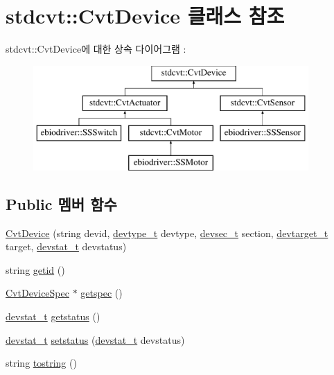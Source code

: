 \hypertarget{classstdcvt_1_1CvtDevice}{}\section{stdcvt\+:\+:Cvt\+Device 클래스 참조}
\label{classstdcvt_1_1CvtDevice}
stdcvt\+:\+:Cvt\+Device에 대한 상속 다이어그램 \+: \begin{figure}[H]
\begin{center}
\leavevmode
\includegraphics[height=4.000000cm]{classstdcvt_1_1CvtDevice}
\end{center}
\end{figure}
\subsection*{Public 멤버 함수}
\begin{DoxyCompactItemize}
\item 
\hyperlink{classstdcvt_1_1CvtDevice_a551fc68d0c8cbcbc8f6c82b375ea3cb0}{Cvt\+Device} (string devid, \hyperlink{cvtcode_8h_ae8e34073e35cef0bb47c7fa535fc638b}{devtype\+\_\+t} devtype, \hyperlink{cvtcode_8h_a268eebb73363e24b9e65fd51973bd9c0}{devsec\+\_\+t} section, \hyperlink{cvtcode_8h_a2b37fd5cc4d40c0b8c4b987c271e5ceb}{devtarget\+\_\+t} target, \hyperlink{cvtcode_8h_ad21cd565f839adc5b19a0993e7da7278}{devstat\+\_\+t} devstatus)
\item 
string \hyperlink{classstdcvt_1_1CvtDevice_aa575c9dda49790224ccee5f6c4302aaf}{getid} ()
\item 
\hyperlink{classstdcvt_1_1CvtDeviceSpec}{Cvt\+Device\+Spec} $\ast$ \hyperlink{classstdcvt_1_1CvtDevice_a29928ec55be4697cb7ba86268fa6aa8a}{getspec} ()
\item 
\hyperlink{cvtcode_8h_ad21cd565f839adc5b19a0993e7da7278}{devstat\+\_\+t} \hyperlink{classstdcvt_1_1CvtDevice_a87d2288d6211d897e4c2a6c9905f5ff3}{getstatus} ()
\item 
\hyperlink{cvtcode_8h_ad21cd565f839adc5b19a0993e7da7278}{devstat\+\_\+t} \hyperlink{classstdcvt_1_1CvtDevice_a6962f56199cccff1c0687ad5087cb211}{setstatus} (\hyperlink{cvtcode_8h_ad21cd565f839adc5b19a0993e7da7278}{devstat\+\_\+t} devstatus)
\item 
string \hyperlink{classstdcvt_1_1CvtDevice_a93b54587e1940918b825d78b18f48062}{tostring} ()
\end{DoxyCompactItemize}


